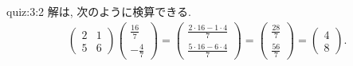 \begin{answerof}{quiz:3:2}
  解は, 次のように検算できる.
  \begin{align*}
    \begin{pmatrix}
      2&1\\5&6
    \end{pmatrix}
    \begin{pmatrix}
      \frac{16}{7}\\-\frac{4}{7}
    \end{pmatrix}
    =
    \begin{pmatrix}
      \frac{2\cdot 16-1\cdot 4}{7}\\\frac{5\cdot 16-6\cdot 4}{7}
    \end{pmatrix}
    =
    \begin{pmatrix}
      \frac{28}{7}\\\frac{56}{7}
    \end{pmatrix}
    =
    \begin{pmatrix}
      4\\8
    \end{pmatrix}.
  \end{align*}
\end{answerof}


